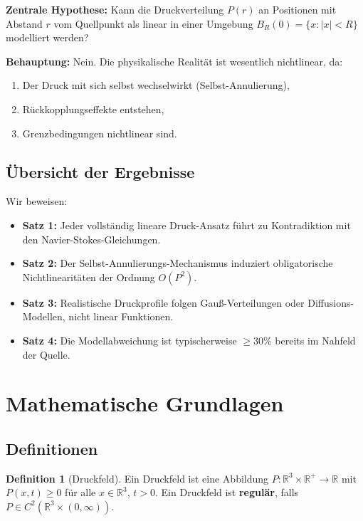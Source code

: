 \documentclass[a4paper,12pt]{article}
\theoremstyle{definition}
\newtheorem{definition}{Definition}
\begin{document}
\textbf{Zentrale Hypothese:} Kann die Druckverteilung $P(r)$ an Positionen mit Abstand $r$ vom Quellpunkt als linear in einer Umgebung $B_R(0) = \{x : |x| < R\}$ modelliert werden?

\textbf{Behauptung:} Nein. Die physikalische Realität ist wesentlich nichtlinear, da:
\begin{enumerate}
	\item Der Druck mit sich selbst wechselwirkt (Selbst-Annulierung),
	\item Rückkopplungseffekte entstehen,
	\item Grenzbedingungen nichtlinear sind.
\end{enumerate}

\subsection{Übersicht der Ergebnisse}

Wir beweisen:
\begin{itemize}
	\item \textbf{Satz 1:} Jeder vollständig lineare Druck-Ansatz führt zu Kontradiktion mit den Navier-Stokes-Gleichungen.
	\item \textbf{Satz 2:} Der Selbst-Annulierungs-Mechanismus induziert obligatorische Nichtlinearitäten der Ordnung $O(P^2)$.
	\item \textbf{Satz 3:} Realistische Druckprofile folgen Gauß-Verteilungen oder Diffusions-Modellen, nicht linear Funktionen.
	\item \textbf{Satz 4:} Die Modellabweichung ist typischerweise $\geq 30\%$ bereits im Nahfeld der Quelle.
\end{itemize}

\section{Mathematische Grundlagen}

\subsection{Definitionen}

\begin{definition}[Druckfeld]
Ein Druckfeld ist eine Abbildung $P: \mathbb{R}^3 \times \mathbb{R}^+ \to \mathbb{R}$ mit $P(x,t) \geq 0$ für alle $x \in \mathbb{R}^3$, $t > 0$. Ein Druckfeld ist \textbf{regulär}, falls $P \in C^2(\mathbb{R}^3 \times (0,\infty))$.
\end{definition}
\end{document}
